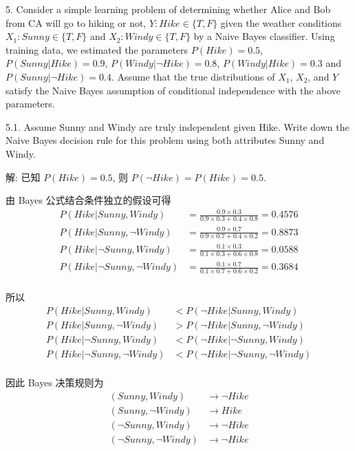 \documentclass[openany]{ctexbook}
\theoremstyle{kaiti}
\theoremstyle{normal}
\begin{document}
5. Consider a simple learning problem of determining whether Alice and Bob from CA will go to hiking or not, $Y:Hike\in\{T,F\}$ given the weather conditions $X_1:Sunny\in\{T,F\}$ and $X_2:Windy\in\{T,F\}$ by a Naive Bayes classifier. Using training data, we estimated the parameters $P(Hike) = 0.5$, $P(Sunny|Hike) = 0.9$, $P(Windy|\neg Hike) = 0.8$, $P(Windy|Hike) = 0.3$ and $P(Sunny|\neg Hike) = 0.4$. Assume that the true distributions of $X_1$, $X_2$, and $Y$ satisfy the Naive Bayes assumption of conditional independence with the above parameters.

5.1. Assume Sunny and Windy are truly independent given Hike. Write down the Naive Bayes decision rule for this problem using both attributes Sunny and Windy.

解: 已知 $P(Hike) = 0.5$, 则 $P(\neg Hike)=P(Hike)=0.5$. 

由 Bayes 公式结合条件独立的假设可得
\begin{equation}
  \begin{aligned}
    P(Hike|Sunny,Windy)&=\frac{0.9\times0.3}{0.9\times0.3+0.4\times0.8}=0.4576\\
    P(Hike|Sunny,\neg Windy)&=\frac{0.9\times0.7}{0.9\times0.7+0.4\times0.2}=0.8873\\
    P(Hike|\neg Sunny,Windy)&=\frac{0.1\times0.3}{0.1\times0.3+0.6\times0.8}=0.0588\\
    P(Hike|\neg Sunny,\neg Windy)&=\frac{0.1\times0.7}{0.1\times0.7+0.6\times0.2}=0.3684\\
  \end{aligned}
\end{equation}

所以
\begin{equation}
  \begin{aligned}
    P(Hike|Sunny,Windy)&<P(\neg Hike|Sunny,Windy)\\
    P(Hike|Sunny,\neg Windy)&>P(\neg Hike|Sunny,\neg Windy)\\
    P(Hike|\neg Sunny,Windy)&<P(\neg Hike|\neg Sunny,Windy)\\
    P(Hike|\neg Sunny,\neg Windy)&<P(\neg Hike|\neg Sunny,\neg Windy)\\
  \end{aligned}
\end{equation}

因此 Bayes 决策规则为
\begin{equation}
  \begin{aligned}
    (Sunny,Windy)&\to\neg Hike\\
    (Sunny,\neg Windy)&\to Hike\\
    (\neg Sunny,Windy)&\to\neg Hike\\
    (\neg Sunny,\neg Windy)&\to\neg Hike\\
  \end{aligned}
\end{equation}
\end{document}
